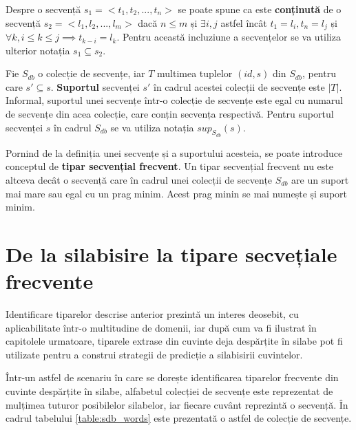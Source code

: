 \begin{defi}
Despre o secvență $s_1=<t_1, t_2, ...,t_n>$ se poate spune ca este \textbf{conținută} de o secvență $s_2=<l_1, l_2, ...,l_m>$ dacă $n \leq m$ și $ \exists i,j$ astfel încât $t_1 = l_i, t_n = l_j$ și $\forall k, i \leq k \leq j \implies t_{k-i} = l_k$. Pentru această incluziune a secvențelor se va utiliza ulterior notația $s_1 \subseteq s_2$.
\end{defi}
      
\begin{defi}

Fie $S_{db}$ o colecție de secvențe, iar $T$ multimea tuplelor $(id, s)$ din $S_{db}$, pentru care $s' \subseteq s$. \textbf{Suportul} secvenței $s'$ în cadrul acestei colecții de secvențe este $\vert T \vert$.  Informal, suportul unei secvențe într-o colecție de secvențe este egal cu numarul de secvențe din acea colecție, care conțin secvența respectivă. Pentru suportul secvenței $s$ în cadrul $S_{db}$ se va utiliza notația $sup_{S_{db}}(s)$.
\end{defi}

\begin{defi}
Pornind de la definiția unei secvențe și a suportului acesteia, se poate introduce conceptul de \textbf{tipar secvențial frecvent}. Un tipar secvențial frecvent nu este altceva decât o secvență care în cadrul unei colecții de secvențe $S_{db}$ are un suport mai mare sau egal cu un prag minim. Acest prag minin se mai numește și suport minim.
\end{defi}
\section{De la silabisire la tipare secvețiale frecvente}
Identificare tiparelor descrise anterior prezintă un interes deosebit, cu aplicabilitate într-o multitudine de domenii, iar după cum va fi ilustrat în capitolele urmatoare, tiparele extrase din cuvinte deja despărțite în silabe pot fi utilizate pentru a construi strategii de predicție a silabisirii cuvintelor. 

\begin{ex}
Într-un astfel de scenariu în care se dorește identificarea tiparelor frecvente din cuvinte despărțite în silabe, alfabetul colecției de secvențe este reprezentat de mulțimea tuturor posibilelor silabelor, iar fiecare cuvânt reprezintă o secvență. În cadrul tabelului \ref{table:sdb_words} este prezentată o astfel de colecție de secvențe.
\end{ex}

